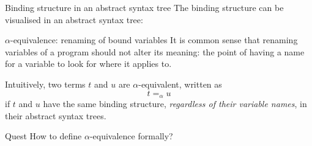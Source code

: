\begin{frame}{Binding structure in an abstract syntax tree}
  The binding structure can be visualised in an abstract syntax tree:
  \begin{center}
  \end{center}
\end{frame}

\begin{frame}{$\alpha$-equivalence: renaming of bound variables}
  It is common sense that renaming variables of a program should not alter its meaning: the point of having a name for a variable to look for where it applies to.

  \vfill
  Intuitively, two terms $t$ and $u$ are \alert{$\alpha$-equivalent}, written as
  \[
    t =_\alpha u
  \]
  if $t$ and $u$ have the same binding structure, \emph{regardless of their variable names}, in their abstract syntax trees.
  \vfill
  \begin{alertblock}{Quest}
    How to define $\alpha$-equivalence formally?
  \end{alertblock}
\end{frame}

